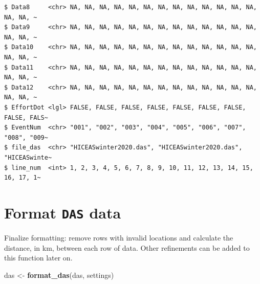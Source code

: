 \documentclass[
]{book}
\newenvironment{Shaded}{\begin{snugshade}}{\end{snugshade}}
\newcommand{\DataTypeTok}[1]{\textcolor[rgb]{0.13,0.29,0.53}{#1}}
\newcommand{\DecValTok}[1]{\textcolor[rgb]{0.00,0.00,0.81}{#1}}
\newcommand{\KeywordTok}[1]{\textcolor[rgb]{0.13,0.29,0.53}{\textbf{#1}}}
\newcommand{\NormalTok}[1]{#1}
\newcommand{\OperatorTok}[1]{\textcolor[rgb]{0.81,0.36,0.00}{\textbf{#1}}}
\newcommand{\OtherTok}[1]{\textcolor[rgb]{0.56,0.35,0.01}{#1}}
\newcommand{\StringTok}[1]{\textcolor[rgb]{0.31,0.60,0.02}{#1}}
\begin{document}
\begin{verbatim}
$ Data8     <chr> NA, NA, NA, NA, NA, NA, NA, NA, NA, NA, NA, NA, NA, NA, NA, ~
$ Data9     <chr> NA, NA, NA, NA, NA, NA, NA, NA, NA, NA, NA, NA, NA, NA, NA, ~
$ Data10    <chr> NA, NA, NA, NA, NA, NA, NA, NA, NA, NA, NA, NA, NA, NA, NA, ~
$ Data11    <chr> NA, NA, NA, NA, NA, NA, NA, NA, NA, NA, NA, NA, NA, NA, NA, ~
$ Data12    <chr> NA, NA, NA, NA, NA, NA, NA, NA, NA, NA, NA, NA, NA, NA, NA, ~
$ EffortDot <lgl> FALSE, FALSE, FALSE, FALSE, FALSE, FALSE, FALSE, FALSE, FALS~
$ EventNum  <chr> "001", "002", "003", "004", "005", "006", "007", "008", "009~
$ file_das  <chr> "HICEASwinter2020.das", "HICEASwinter2020.das", "HICEASwinte~
$ line_num  <int> 1, 2, 3, 4, 5, 6, 7, 8, 9, 10, 11, 12, 13, 14, 15, 16, 17, 1~
\end{verbatim}

\hypertarget{format-das-data}{%
\section*{\texorpdfstring{Format \texttt{DAS} data}{Format DAS data}}\label{format-das-data}}

Finalize formatting: remove rows with invalid locations and calculate the distance, in km, between each row of data. Other refinements can be added to this function later on.

\begin{Shaded}
\begin{Highlighting}[]
\NormalTok{das <-}\StringTok{ }\KeywordTok{format_das}\NormalTok{(das, settings)}
\end{Highlighting}
\end{Shaded}

\begin{Shaded}
\end{Shaded}
\end{document}
